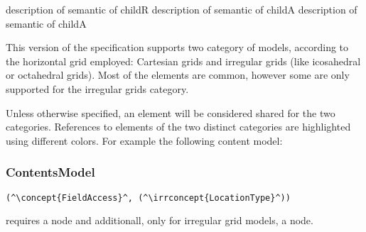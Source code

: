 \begin{HIRChildElements}
	{description of semantic of child}{R}
	{description of semantic of child}{A}
	{description of semantic of child}{A}
\end{HIRChildElements}

This version of the specification supports two category of models, 
according to the horizontal grid employed: Cartesian grids and
irregular grids (like icosahedral or octahedral grids). 
Most of the elements are common, however some are only 
supported for the irregular grids category. 

Unless otherwise specified, an element will be considered 
shared for the two categories.
References to elements of the two distinct categories 
are highlighted using different colors. 
For example the following content model: 

\subsubsection*{ContentsModel}{}

\begin{lstlisting}[style=default,frame=none]
(^\concept{FieldAccess}^, (^\irrconcept{LocationType}^))
\end{lstlisting}

requires a  node and additionall, 
only for irregular grid models, a 
node.
